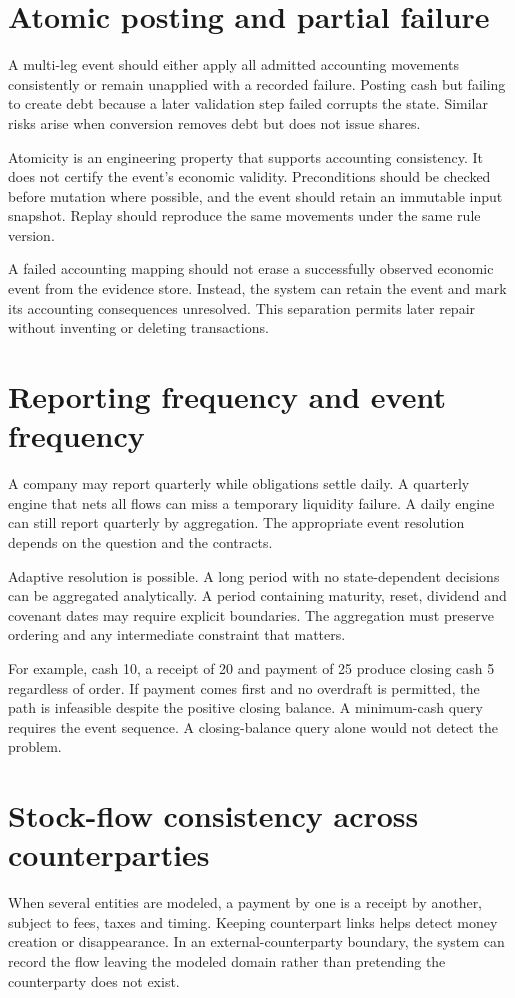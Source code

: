 \section{Atomic posting and partial failure}
A multi-leg event should either apply all admitted accounting movements consistently or remain unapplied with a recorded failure. Posting cash but failing to create debt because a later validation step failed corrupts the state. Similar risks arise when conversion removes debt but does not issue shares.

Atomicity is an engineering property that supports accounting consistency. It does not certify the event's economic validity. Preconditions should be checked before mutation where possible, and the event should retain an immutable input snapshot. Replay should reproduce the same movements under the same rule version.

A failed accounting mapping should not erase a successfully observed economic event from the evidence store. Instead, the system can retain the event and mark its accounting consequences unresolved. This separation permits later repair without inventing or deleting transactions.

\section{Reporting frequency and event frequency}
A company may report quarterly while obligations settle daily. A quarterly engine that nets all flows can miss a temporary liquidity failure. A daily engine can still report quarterly by aggregation. The appropriate event resolution depends on the question and the contracts.

Adaptive resolution is possible. A long period with no state-dependent decisions can be aggregated analytically. A period containing maturity, reset, dividend and covenant dates may require explicit boundaries. The aggregation must preserve ordering and any intermediate constraint that matters.

For example, cash 10, a receipt of 20 and payment of 25 produce closing cash 5 regardless of order. If payment comes first and no overdraft is permitted, the path is infeasible despite the positive closing balance. A minimum-cash query requires the event sequence. A closing-balance query alone would not detect the problem.

\section{Stock-flow consistency across counterparties}
When several entities are modeled, a payment by one is a receipt by another, subject to fees, taxes and timing. Keeping counterpart links helps detect money creation or disappearance. In an external-counterparty boundary, the system can record the flow leaving the modeled domain rather than pretending the counterparty does not exist.

